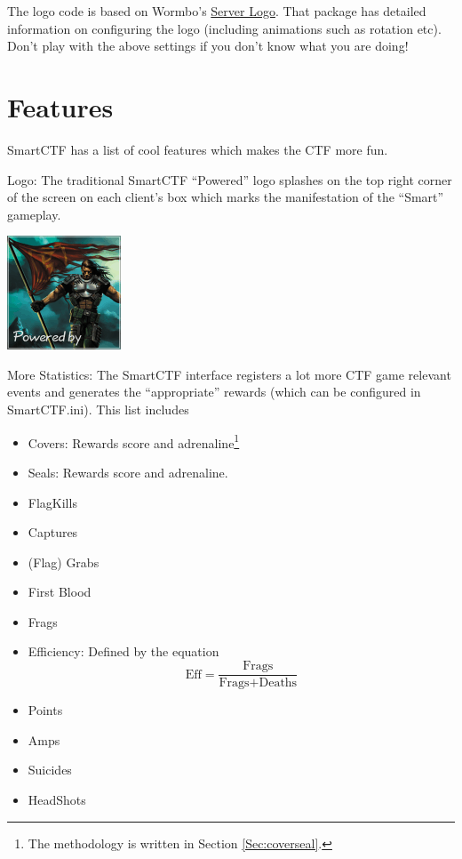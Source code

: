 \documentclass{article}
\begin{document}
The logo code is based on Wormbo's \href{http://www.koehler-homepage.de/Wormbo/download2k4.html#ServerLogo}{{\color{Blue}Server Logo}}.  That package has detailed information on configuring the logo (including animations such as rotation etc).  Don't play with the above settings if you don't know what you are doing!

\section{Features}
\label{sec:features}
SmartCTF has a list of cool features which makes the CTF more fun.
\begin{itemize}
 \parbox[b]{.7\textwidth}{\item Logo: The traditional SmartCTF ``Powered'' logo splashes on the top right corner of the screen on each client's box which marks the manifestation of the ``Smart'' gameplay.} \hfill\includegraphics[width=.15\textwidth]{powered}
\item\label{item:morestats} More Statistics: The SmartCTF interface registers a lot more CTF game relevant events and generates the ``appropriate'' rewards (which can be configured in {\color{Purple}SmartCTF.ini}).  This list includes
  \begin{itemize}
  \item Covers: Rewards score and adrenaline\footnote{The methodology is written in Section \ref{Sec:coverseal}.}
  \item Seals: Rewards score and adrenaline.  
  \item FlagKills
  \item Captures
  \item (Flag) Grabs
  \item {\color{Red}First Blood}
  \item Frags
  \item Efficiency: Defined by the equation
    \begin{equation}
      \text{Eff} = \frac{\text{Frags}}{\text{Frags} + \text{Deaths}}
    \end{equation}
  \item Points
  \item Amps
  \item Suicides
  \item HeadShots 

\end{itemize}
\end{itemize}
\end{document}
